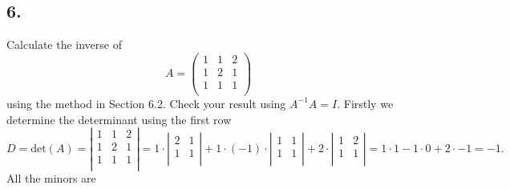 \subsection*{6.}
Calculate the inverse of
\[ 
A = \begin{pmatrix}
1 & 1 & 2\\
1 & 2 & 1\\
1 & 1 & 1\\
\end{pmatrix}
\]
using the method in Section 6.2. Check your result using $A^{-1} A = I$.
\bigbreak
Firstly we determine the determinant using the first row
\[ 
D = \mathrm{det}(A) = \left| \begin{array}{ccc}
1 & 1 & 2\\
1 & 2 & 1\\
1 & 1 & 1\\
\end{array} \right| = 1 \cdot \left| \begin{array}{cc}
2 & 1\\
1 & 1\\
\end{array} \right| + 1\cdot (-1) \cdot \left| \begin{array}{cc}
1 & 1\\
1 & 1\\
\end{array} \right| + 2 \cdot \left| \begin{array}{cc}
1 & 2\\
1 & 1\\
\end{array} \right| = 1 \cdot 1 -1 \cdot 0 + 2 \cdot -1 = -1
.\]
All the minors are

